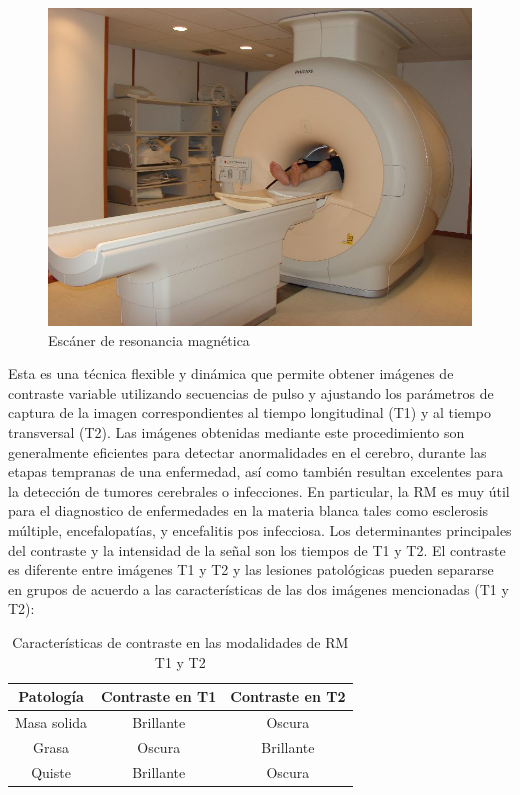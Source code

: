 \begin{figure}[H]
\centering
\includegraphics[scale=0.3]{images/scanner.jpg}
\caption{Escáner de resonancia magnética}
\label{fig:scanner:mri}
\end{figure}

Esta es una técnica flexible y dinámica que permite obtener imágenes de contraste variable utilizando secuencias de pulso y ajustando los parámetros de captura de la imagen correspondientes al tiempo longitudinal (T1) y al tiempo transversal (T2). Las imágenes obtenidas mediante este procedimiento son generalmente eficientes para detectar anormalidades en el cerebro, durante las etapas tempranas de una enfermedad, así como también resultan excelentes para la detección de tumores cerebrales o infecciones. En particular, la RM es muy útil para el diagnostico de enfermedades en la materia blanca tales como esclerosis múltiple, encefalopatías, y encefalitis pos infecciosa. Los determinantes principales del contraste y la intensidad de la señal son los tiempos de T1 y T2. El contraste es diferente entre imágenes T1 y T2 y las lesiones patológicas pueden separarse en grupos de acuerdo a las características de las dos imágenes mencionadas (T1 y T2):


\begin{table}[H]
	\centering
	\begin{tabular}{c|c c}
	Patología & Contraste en T1 & Contraste en T2   \\ 
	\hline Masa solida & Brillante & Oscura  \\ 
	Grasa & Oscura & Brillante  \\ 
	Quiste &	Brillante &	Oscura  \\ 
	\end{tabular}
	\caption{Características de contraste en las modalidades de RM T1 y T2}
	\label{tab:colores_por_MRI}
\end{table}

